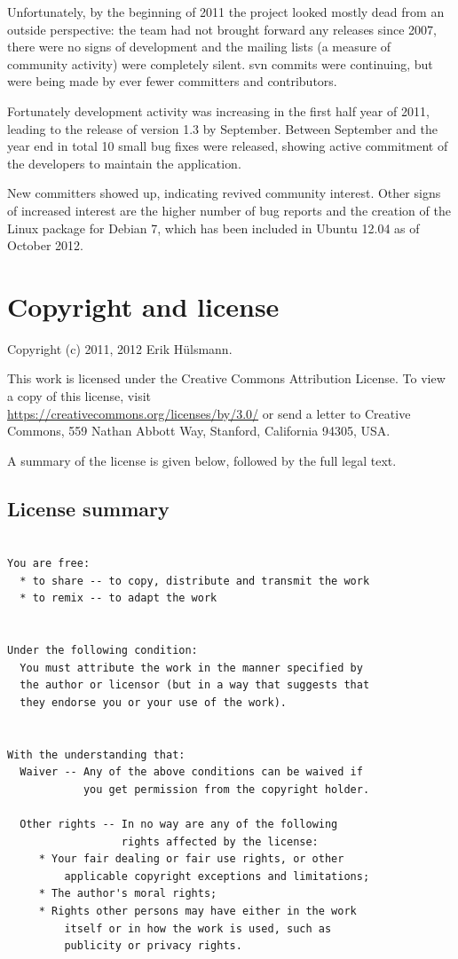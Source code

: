 Unfortunately, by the beginning of 2011 the project looked mostly dead from
an outside perspective: the team had not brought forward any releases since
2007, there were no signs of development and the mailing lists (a measure
of community activity) were
completely silent.  \gls{svn} commits were continuing, but were being made by
ever fewer committers and contributors.

Fortunately development activity was increasing in the first half year of 2011,
leading to the release of version 1.3 by September.  Between September and the
year end in total 10 small bug fixes were released, showing active commitment
of the developers to maintain the application.

New committers showed up, indicating revived community interest. Other signs of
increased interest are the higher number of bug reports and the creation of the
Linux package for Debian 7, which has been included in Ubuntu 12.04 as of
October 2012.



\chapter{Copyright and license}
\label{app-copyright-license}

Copyright (c) 2011, 2012 Erik H\"ulsmann.


This work is licensed under the Creative Commons Attribution License.
To view a copy of this license, visit\\
\url{https://creativecommons.org/licenses/by/3.0/}
or send a letter to Creative Commons, 559 Nathan Abbott Way,
Stanford, California 94305, USA.

A summary of the license is given below, followed by the full legal text.

\section{License summary}
\label{sec-license-summary}

\begin{verbatim}

You are free:
  * to share -- to copy, distribute and transmit the work
  * to remix -- to adapt the work


Under the following condition:
  You must attribute the work in the manner specified by
  the author or licensor (but in a way that suggests that
  they endorse you or your use of the work).


With the understanding that:
  Waiver -- Any of the above conditions can be waived if
            you get permission from the copyright holder.
  
  Other rights -- In no way are any of the following
                  rights affected by the license:
     * Your fair dealing or fair use rights, or other
         applicable copyright exceptions and limitations;
     * The author's moral rights;
     * Rights other persons may have either in the work
         itself or in how the work is used, such as
         publicity or privacy rights.

\end{verbatim}



